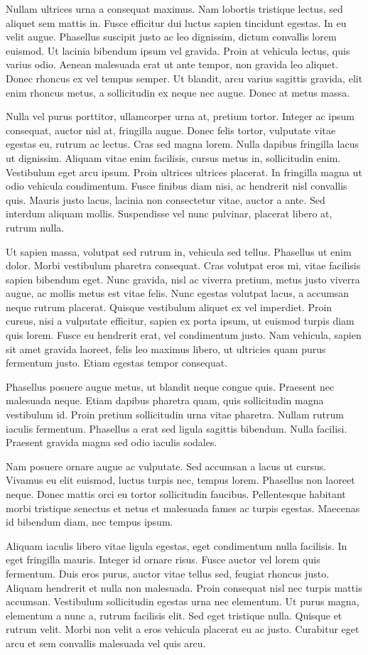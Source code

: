 \documentclass[a4paper,11pt]{article}
\begin{document}
Nullam ultrices urna a consequat maximus. Nam lobortis tristique lectus, sed aliquet sem mattis in. Fusce efficitur dui luctus sapien tincidunt egestas. In eu velit augue. Phasellus suscipit justo ac leo dignissim, dictum convallis lorem euismod. Ut lacinia bibendum ipsum vel gravida. Proin at vehicula lectus, quis varius odio. Aenean malesuada erat ut ante tempor, non gravida leo aliquet. Donec rhoncus ex vel tempus semper. Ut blandit, arcu varius sagittis gravida, elit enim rhoncus metus, a sollicitudin ex neque nec augue. Donec at metus massa.

Nulla vel purus porttitor, ullamcorper urna at, pretium tortor. Integer ac ipsum consequat, auctor nisl at, fringilla augue. Donec felis tortor, vulputate vitae egestas eu, rutrum ac lectus. Cras sed magna lorem. Nulla dapibus fringilla lacus ut dignissim. Aliquam vitae enim facilisis, cursus metus in, sollicitudin enim. Vestibulum eget arcu ipsum. Proin ultrices ultrices placerat. In fringilla magna ut odio vehicula condimentum. Fusce finibus diam nisi, ac hendrerit nisl convallis quis. Mauris justo lacus, lacinia non consectetur vitae, auctor a ante. Sed interdum aliquam mollis. Suspendisse vel nunc pulvinar, placerat libero at, rutrum nulla.

Ut sapien massa, volutpat sed rutrum in, vehicula sed tellus. Phasellus ut enim dolor. Morbi vestibulum pharetra consequat. Cras volutpat eros mi, vitae facilisis sapien bibendum eget. Nunc gravida, nisl ac viverra pretium, metus justo viverra augue, ac mollis metus est vitae felis. Nunc egestas volutpat lacus, a accumsan neque rutrum placerat. Quisque vestibulum aliquet ex vel imperdiet. Proin cursus, nisi a vulputate efficitur, sapien ex porta ipsum, ut euismod turpis diam quis lorem. Fusce eu hendrerit erat, vel condimentum justo. Nam vehicula, sapien sit amet gravida laoreet, felis leo maximus libero, ut ultricies quam purus fermentum justo. Etiam egestas tempor consequat.

Phasellus posuere augue metus, ut blandit neque congue quis. Praesent nec malesuada neque. Etiam dapibus pharetra quam, quis sollicitudin magna vestibulum id. Proin pretium sollicitudin urna vitae pharetra. Nullam rutrum iaculis fermentum. Phasellus a erat sed ligula sagittis bibendum. Nulla facilisi. Praesent gravida magna sed odio iaculis sodales.

Nam posuere ornare augue ac vulputate. Sed accumsan a lacus ut cursus. Vivamus eu elit euismod, luctus turpis nec, tempus lorem. Phasellus non laoreet neque. Donec mattis orci eu tortor sollicitudin faucibus. Pellentesque habitant morbi tristique senectus et netus et malesuada fames ac turpis egestas. Maecenas id bibendum diam, nec tempus ipsum.

Aliquam iaculis libero vitae ligula egestas, eget condimentum nulla facilisis. In eget fringilla mauris. Integer id ornare risus. Fusce auctor vel lorem quis fermentum. Duis eros purus, auctor vitae tellus sed, feugiat rhoncus justo. Aliquam hendrerit et nulla non malesuada. Proin consequat nisl nec turpis mattis accumsan. Vestibulum sollicitudin egestas urna nec elementum. Ut purus magna, elementum a nunc a, rutrum facilisis elit. Sed eget tristique nulla. Quisque et rutrum velit. Morbi non velit a eros vehicula placerat eu ac justo. Curabitur eget arcu et sem convallis malesuada vel quis arcu. 
\end{document}
